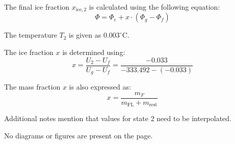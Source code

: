 The final ice fraction \( x_{\text{ice},2} \) is calculated using the following equation:  
\[
\Phi = \Phi_e + x \cdot (\Phi_g - \Phi_f)
\]  

The temperature \( T_2 \) is given as \( 0.003^\circ\text{C} \).  

The ice fraction \( x \) is determined using:  
\[
x = \frac{U_2 - U_f}{U_g - U_f} = \frac{-0.033}{-333.492 - (-0.033)}
\]  

The mass fraction \( x \) is also expressed as:  
\[
x = \frac{m_F}{m_{\text{FL}} + m_{\text{rest}}}
\]  

Additional notes mention that values for state 2 need to be interpolated.  

No diagrams or figures are present on the page.